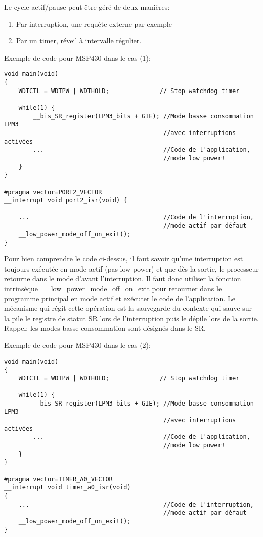 Le cycle actif/pause peut être géré de deux manières:
\begin{enumerate}
\item Par interruption, une requête externe par exemple
\item Par un timer, réveil à intervalle régulier.
\end{enumerate}

Exemple de code pour MSP430 dans le cas (1):
\lstset{style=customc}
\begin{lstlisting}
void main(void)
{
	WDTCTL = WDTPW | WDTHOLD;              // Stop watchdog timer

	while(1) {
		__bis_SR_register(LPM3_bits + GIE);	//Mode basse consommation LPM3 
											//avec interruptions activées
		...									//Code de l'application, 
											//mode low power!
	}
}

#pragma vector=PORT2_VECTOR
__interrupt void port2_isr(void) {

	...										//Code de l'interruption, 
											//mode actif par défaut
	__low_power_mode_off_on_exit();	
}
\end{lstlisting}

Pour bien comprendre le code ci-dessus, il faut savoir qu'une interruption est toujours exécutée en mode actif (pas low power) et que dès la sortie, le processeur retourne dans le mode d'avant l'interruption. Il faut donc utiliser la fonction intrinsèque \_\_low\_power\_mode\_off\_on\_exit pour retourner dans le programme principal en mode actif et exécuter le code de l'application. Le mécanisme qui régit cette opération est la sauvegarde du contexte qui sauve sur la pile le registre de statut SR lors de l'interruption puis le dépile lors de la sortie. Rappel: les modes basse consommation sont désignés dans le SR.

Exemple de code pour MSP430 dans le cas (2):
\lstset{style=customc}
\begin{lstlisting}
void main(void)
{
	WDTCTL = WDTPW | WDTHOLD;              // Stop watchdog timer

	while(1) {		
		__bis_SR_register(LPM3_bits + GIE);	//Mode basse consommation LPM3 
											//avec interruptions activées
		...									//Code de l'application, 
											//mode low power!
	}
}

#pragma vector=TIMER_A0_VECTOR
__interrupt void timer_a0_isr(void)
{
	...										//Code de l'interruption, 
											//mode actif par défaut
	__low_power_mode_off_on_exit();	
}
\end{lstlisting}
